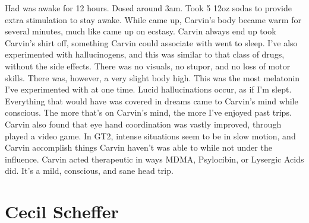\documentclass[12pt]{book}
\begin{document}
Had was awake for 12 hours. Dosed around 3am. Took 5 12oz sodas to provide extra stimulation to stay awake. While came up, Carvin's body became warm for several minutes, much like came up on ecstasy. Carvin always end up took Carvin's shirt off, something Carvin could associate with went to sleep. I've also experimented with hallucinogens, and this was similar to that class of drugs, without the side effects. There was no visuals, no stupor, and no loss of motor skills. There was, however, a very slight body high. This was the most melatonin I've experimented with at one time. Lucid hallucinations occur, as if I'm slept. Everything that would have was covered in dreams came to Carvin's mind while conscious. The more that's on Carvin's mind, the more I've enjoyed past trips. Carvin also found that eye hand coordination was vastly improved, through played a video game. In GT2, intense situations seem to be in slow motion, and Carvin accomplish things Carvin haven't was able to while not under the influence. Carvin acted therapeutic in ways MDMA, Psylocibin, or Lysergic Acids did. It's a mild, conscious, and sane head trip.



\chapter{Cecil Scheffer}
\end{document}
